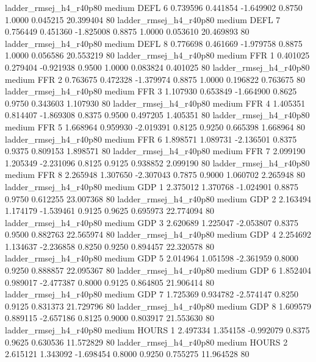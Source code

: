 ladder_rmsej_h4_r40p80     medium     DEFL                 6  0.739596 0.441854 -1.649902 0.8750 1.0000  0.045215   20.399404 80
ladder_rmsej_h4_r40p80     medium     DEFL                 7  0.756449 0.451360 -1.825008 0.8875 1.0000  0.053610   20.469893 80
ladder_rmsej_h4_r40p80     medium     DEFL                 8  0.776698 0.461669 -1.979758 0.8875 1.0000  0.056586   20.553219 80
ladder_rmsej_h4_r40p80     medium      FFR                 1  0.401025 0.279404 -0.921938 0.9500 1.0000  0.083824    0.401025 80
ladder_rmsej_h4_r40p80     medium      FFR                 2  0.763675 0.472328 -1.379974 0.8875 1.0000  0.196822    0.763675 80
ladder_rmsej_h4_r40p80     medium      FFR                 3  1.107930 0.653849 -1.664900 0.8625 0.9750  0.343603    1.107930 80
ladder_rmsej_h4_r40p80     medium      FFR                 4  1.405351 0.814407 -1.869308 0.8375 0.9500  0.497205    1.405351 80
ladder_rmsej_h4_r40p80     medium      FFR                 5  1.668964 0.959930 -2.019391 0.8125 0.9250  0.665398    1.668964 80
ladder_rmsej_h4_r40p80     medium      FFR                 6  1.898571 1.089731 -2.136501 0.8375 0.9375  0.809153    1.898571 80
ladder_rmsej_h4_r40p80     medium      FFR                 7  2.099190 1.205349 -2.231096 0.8125 0.9125  0.938852    2.099190 80
ladder_rmsej_h4_r40p80     medium      FFR                 8  2.265948 1.307650 -2.307043 0.7875 0.9000  1.060702    2.265948 80
ladder_rmsej_h4_r40p80     medium      GDP                 1  2.375012 1.370768 -1.024901 0.8875 0.9750  0.612255   23.007368 80
ladder_rmsej_h4_r40p80     medium      GDP                 2  2.163494 1.174179 -1.539461 0.9125 0.9625  0.695973   22.774094 80
ladder_rmsej_h4_r40p80     medium      GDP                 3  2.620689 1.225047 -2.053807 0.8375 0.9500  0.882763   22.565974 80
ladder_rmsej_h4_r40p80     medium      GDP                 4  2.254692 1.134637 -2.236858 0.8250 0.9250  0.894457   22.320578 80
ladder_rmsej_h4_r40p80     medium      GDP                 5  2.014964 1.051598 -2.361959 0.8000 0.9250  0.888857   22.095367 80
ladder_rmsej_h4_r40p80     medium      GDP                 6  1.852404 0.989017 -2.477387 0.8000 0.9125  0.864805   21.906414 80
ladder_rmsej_h4_r40p80     medium      GDP                 7  1.725369 0.934782 -2.574147 0.8250 0.9125  0.831373   21.729796 80
ladder_rmsej_h4_r40p80     medium      GDP                 8  1.609579 0.889115 -2.657186 0.8125 0.9000  0.803917   21.553630 80
ladder_rmsej_h4_r40p80     medium    HOURS                 1  2.497334 1.354158 -0.992079 0.8375 0.9625  0.630536   11.572829 80
ladder_rmsej_h4_r40p80     medium    HOURS                 2  2.615121 1.343092 -1.698454 0.8000 0.9250  0.755275   11.964528 80
